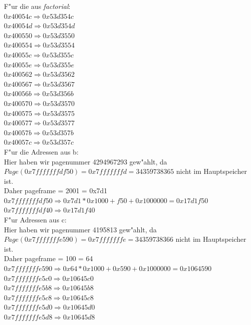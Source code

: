 \documentclass{ti2}
\begin{document}
F"ur die aus \emph{factorial}:\\
$0x40054c \Rightarrow 0x53d354c$\\
$0x40054d \Rightarrow 0x53d354d$\\
$0x400550 \Rightarrow 0x53d3550$\\
$0x400554 \Rightarrow 0x53d3554$\\
$0x40055c \Rightarrow 0x53d355c$\\
$0x40055e \Rightarrow 0x53d355e$\\
$0x400562 \Rightarrow 0x53d3562$\\
$0x400567 \Rightarrow 0x53d3567$\\
$0x40056b \Rightarrow 0x53d356b$\\
$0x400570 \Rightarrow 0x53d3570$\\
$0x400575 \Rightarrow 0x53d3575$\\
$0x400577 \Rightarrow 0x53d3577$\\
$0x40057b \Rightarrow 0x53d357b$\\
$0x40057c \Rightarrow 0x53d357c$\\

F"ur die Adressen aus b:\\
Hier haben wir pagenummer 4294967293 gew"ahlt, da $Page(0x7fffffffdf50)= 0x7fffffffd = 34359738365$ nicht im Hauptspeicher ist. \\
Daher pageframe = 2001 = 0x7d1\\

$0x7fffffffdf50 \Rightarrow 0x7d1 * 0x1000 + f50 + 0x1000000 = 0x17d1f50 $\\
$0x7fffffffdf40 \Rightarrow 0x17d1f40$\\

F"ur Adressen aus c:\\
Hier haben wir pagenummer 4195813 gew"ahlt, da $Page(0x7fffffffe590)= 0x7fffffffe = 34359738366$ nicht im Hauptspeicher ist. \\
Daher pageframe = 100 = 64\
\
$0x7fffffffe590 \Rightarrow 0x64 * 0x1000 + 0x590 + 0x1000000 = 0x1064590 $\\
$0x7fffffffe5c0 \Rightarrow 0x10645c0 $\\
$0x7fffffffe5b8 \Rightarrow 0x10645b8 $\\
$0x7fffffffe5c8 \Rightarrow 0x10645c8 $\\
$0x7fffffffe5d0 \Rightarrow 0x10645d0 $\\
$0x7fffffffe5d8 \Rightarrow 0x10645d8 $\\
\end{document}
